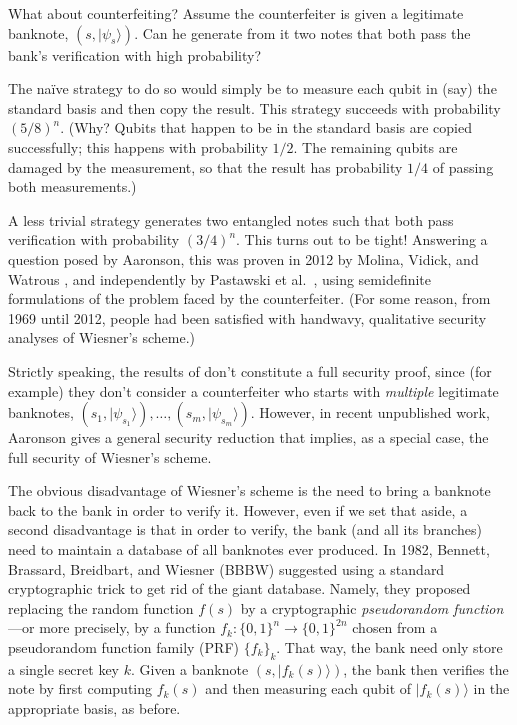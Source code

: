 \documentclass[11pt]{report}
\theoremstyle{plain}
\theoremstyle{definition}
\renewcommand{\ket}[1]{|#1\rangle}
\begin{document}
What about counterfeiting?  Assume the counterfeiter is given a legitimate banknote, $(s,\ket{\psi_s})$.  Can he generate from it two notes that both pass the bank's verification with high probability?

The na\"{i}ve strategy to do so would simply be to measure each qubit in (say) the standard basis and then copy the result.  This strategy succeeds with probability $(5/8)^n$. (Why? Qubits that happen to be in the standard basis are copied successfully; this happens with probability $1/2$.  The remaining qubits are damaged by the measurement, so that the result has probability $1/4$ of passing both measurements.)

A less trivial strategy generates two entangled notes such that both pass verification with probability $(3/4)^n$.  This turns out to be tight!  Answering a question posed by Aaronson, this was proven in 2012 by Molina, Vidick, and Watrous \cite{mvw}, and independently by Pastawski et al.\ \cite{pastawski}, using semidefinite formulations of the problem faced by the counterfeiter.  (For some reason, from 1969 until 2012, people had been satisfied with handwavy, qualitative security analyses of Wiesner's scheme.)

Strictly speaking, the results of \cite{mvw,pastawski} don't constitute a full security proof, since (for example) they don't consider a counterfeiter who starts with {\em multiple} legitimate banknotes, $(s_1,\ket{\psi_{s_1}}),\ldots,(s_m,\ket{\psi_{s_m}})$.  However, in recent unpublished work, Aaronson gives a general security reduction that implies, as a special case, the full security of Wiesner's scheme.

The obvious disadvantage of Wiesner's scheme is the need to bring a banknote back to the bank in order to verify it.  However, even if we set that aside, a second disadvantage is that in order to verify, the bank (and all its branches) need to maintain a database of all banknotes ever produced.
In 1982, Bennett, Brassard, Breidbart, and Wiesner (BBBW) \cite{bbbw} suggested using a standard cryptographic trick to get rid of the giant database. Namely, they proposed replacing the random function $f(s)$ by a cryptographic \emph{pseudorandom function}---or more precisely, by a function $f_k:\{0,1\}^n\longrightarrow \{0,1\}^{2n}$ chosen from a pseudorandom function family (PRF) $\{f_k\}_k$.  That way, the bank need only store a single secret key $k$.  Given a banknote $(s,\ket{f_k(s)})$, the bank then verifies the note by first computing $f_k(s)$ and then measuring each qubit of $\ket{f_k(s)}$ in the appropriate basis, as before.
\end{document}

